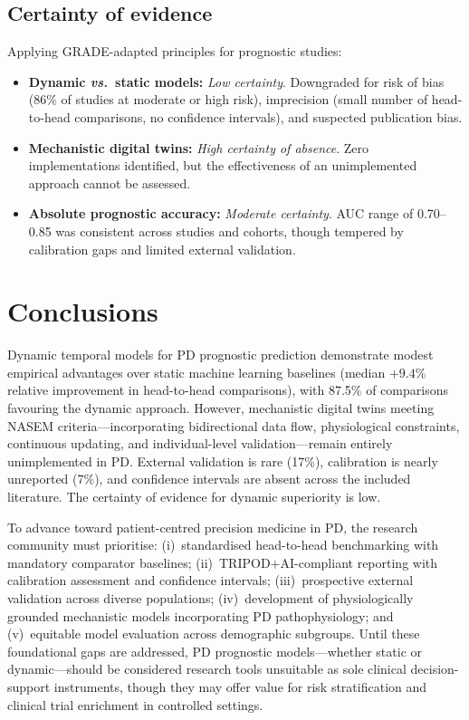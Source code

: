 \documentclass[11pt,a4paper]{article}
\begin{document}
\subsection{Certainty of evidence}

Applying GRADE-adapted principles for prognostic studies:
\begin{itemize}[leftmargin=*]
    \item \textbf{Dynamic \textit{vs.}\ static models:} \textit{Low certainty}. Downgraded for risk of bias (86\% of studies at moderate or high risk), imprecision (small number of head-to-head comparisons, no confidence intervals), and suspected publication bias.
    \item \textbf{Mechanistic digital twins:} \textit{High certainty of absence}. Zero implementations identified, but the effectiveness of an unimplemented approach cannot be assessed.
    \item \textbf{Absolute prognostic accuracy:} \textit{Moderate certainty}. AUC range of 0.70--0.85 was consistent across studies and cohorts, though tempered by calibration gaps and limited external validation.
\end{itemize}

\section{Conclusions}

Dynamic temporal models for PD prognostic prediction demonstrate modest empirical advantages over static machine learning baselines (median $+9.4\%$ relative improvement in head-to-head comparisons), with 87.5\% of comparisons favouring the dynamic approach. However, mechanistic digital twins meeting NASEM criteria---incorporating bidirectional data flow, physiological constraints, continuous updating, and individual-level validation---remain entirely unimplemented in PD. External validation is rare (17\%), calibration is nearly unreported (7\%), and confidence intervals are absent across the included literature. The certainty of evidence for dynamic superiority is low.

To advance toward patient-centred precision medicine in PD, the research community must prioritise: (i)~standardised head-to-head benchmarking with mandatory comparator baselines; (ii)~TRIPOD+AI-compliant reporting with calibration assessment and confidence intervals; (iii)~prospective external validation across diverse populations; (iv)~development of physiologically grounded mechanistic models incorporating PD pathophysiology; and (v)~equitable model evaluation across demographic subgroups. Until these foundational gaps are addressed, PD prognostic models---whether static or dynamic---should be considered research tools unsuitable as sole clinical decision-support instruments, though they may offer value for risk stratification and clinical trial enrichment in controlled settings.
\end{document}
